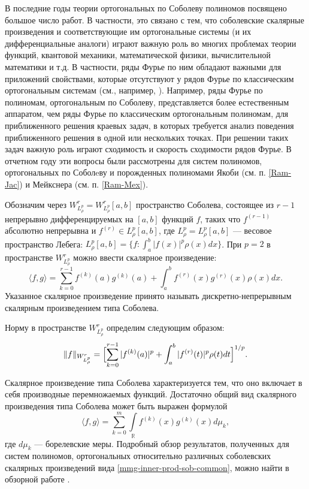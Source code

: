 \Introduction

В последние годы теории ортогональных по Соболеву полиномов посвящено большое число работ. В частности, это связано с тем, что соболевские скалярные произведения и соответствующие им ортогональные системы (и их дифференциальные аналоги) играют важную роль во многих проблемах теории функций, квантовой механики, математической физики, вычислительной математики и т.д. В частности, ряды Фурье по ним обладают важными для приложений свойствами, которые отсутствуют у рядов Фурье по классическим ортогональным системам (см., например, \cite{Ram-Ba-Ra-Pe,Ram-Mar-Xu,Ram-Shar-UMN}).
Например, ряды Фурье по полиномам, ортогональным по Соболеву, представляется более естественным аппаратом, чем ряды Фурье по классическим ортогональным полиномам, для приближенного решения краевых задач, в которых требуется анализ поведения приближенного решения в одной или нескольких точках.
При решении таких задач важную роль играют сходимость и скорость сходимости рядов Фурье. В отчетном году эти вопросы были рассмотрены для систем полиномов, ортогональных по Соболeву и порожденных полиномами Якоби (см. п. \ref{Ram-Jac}) и Мейкснера (см. п. \ref{Ram-Mex}).

Обозначим через $W^r_{L^p_\rho}=W^r_{L^p_\rho}[a,b]$ пространство Соболева, состоящее из $r-1$ непрерывно дифференцируемых на $[a,b]$ функций $f$, таких что $f^{(r-1)}$ абсолютно непрерывна и $f^{(r)} \in L^p_\rho[a,b]$, где $L^p_\rho=L^p_\rho[a,b]$ --- весовое пространство Лебега: $L^p_\rho[a,b] = \{ f: \int_a^b |f(x)|^p\rho(x)dx \}$. При $p=2$ в пространстве $W^r_{L^p_\rho}$ можно ввести скалярное произведение:
\begin{equation}\label{mmg-sob-prod}
	\langle f, g \rangle = \sum_{k=0}^{r-1}f^{(k)}(a)g^{(k)}(a)+\int_a^b f^{(r)}(x)g^{(r)}(x)\rho(x)dx.
\end{equation}
Указанное скалярное произведение принято называть дискретно-непрерывным скалярным произведением типа Соболева.

Норму в пространстве $W^r_{L^p_\rho}$ определим следующим образом:
\begin{equation}\label{mmg-sob-norm-def}
	\|f\|_{W^r_{L^p_\rho}} = \Bigl[
	\sum_{k=0}^{r-1}|f^{(k)}(a)|^p + \int_a^b |f^{(r)}(t)|^p \rho(t)dt
	\Bigr]^{1/p}.
\end{equation}

Скалярное произведение типа Соболева характеризуется тем, что оно включает в себя производные перемножаемых функций. Достаточно общий вид скалярного произведения типа Соболева может быть выражен формулой
\begin{equation}\label{mmg-inner-prod-sob-common}
	\langle f,g \rangle = \sum_{k=0}^{m}\int\limits_{\mathbb{R}}f^{(k)}(x)g^{(k)}(x)d\mu_k,
\end{equation}
где $d\mu_k$ --- борелевские меры. Подробный обзор результатов, полученных для систем полиномов, ортогональных относительно различных соболевских скалярных произведений вида \eqref{mmg-inner-prod-sob-common}, можно найти в обзорной работе \cite{mmg-MarcellanXu2015}.

